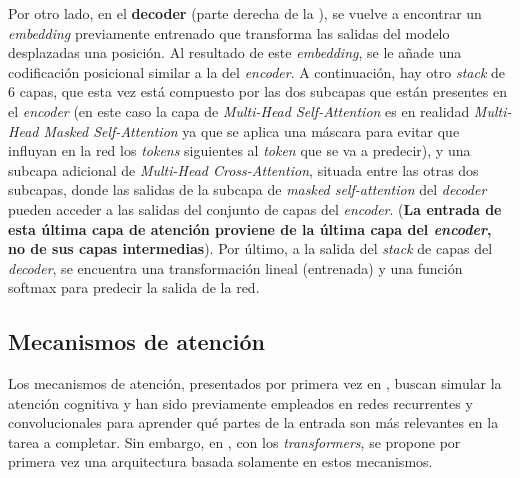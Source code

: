 \vspace{2mm}
Por otro lado, en el \textbf{decoder} (parte derecha de la ), se vuelve a encontrar un \textit{embedding} previamente entrenado que transforma las salidas del modelo desplazadas una posición. Al resultado de este \textit{embedding}, se le añade una codificación posicional similar a la del \textit{encoder}. A continuación, hay otro \textit{stack} de 6 capas, que esta vez está compuesto por las dos subcapas que están presentes en el \textit{encoder} (en este caso la capa de \textit{Multi-Head Self-Attention} es en realidad \textit{Multi-Head Masked Self-Attention} ya que se aplica una máscara para evitar que influyan en la red los \textit{tokens} siguientes al \textit{token} que se va a predecir), y una subcapa adicional de \textit{Multi-Head Cross-Attention}, situada entre las otras dos subcapas, donde las salidas de la subcapa de \textit{masked self-attention} del \textit{decoder} pueden acceder a las salidas del conjunto de capas del \textit{encoder}. (\textbf{La entrada de esta última capa de atención proviene de la última capa del \textit{encoder}, no de sus capas intermedias}). Por último, a la salida del \textit{stack} de capas del \textit{decoder}, se encuentra una transformación lineal (entrenada) y una función softmax para predecir la salida de la red.

\subsection{Mecanismos de atención}\label{bloques-atencion}

\vspace{2mm}
Los mecanismos de atención, presentados por primera vez en \cite{neuralmachinetranslationalignandtranslate}, buscan simular la atención cognitiva y han sido previamente empleados en redes recurrentes \cite{pmlr-v37-xuc15} y convolucionales \cite{7298685, 7410695} para aprender qué partes de la entrada son más relevantes en la tarea a completar. Sin embargo, en \cite{NIPS2017_3f5ee243}, con los \textit{transformers}, se propone por primera vez una arquitectura basada solamente en estos mecanismos. 

